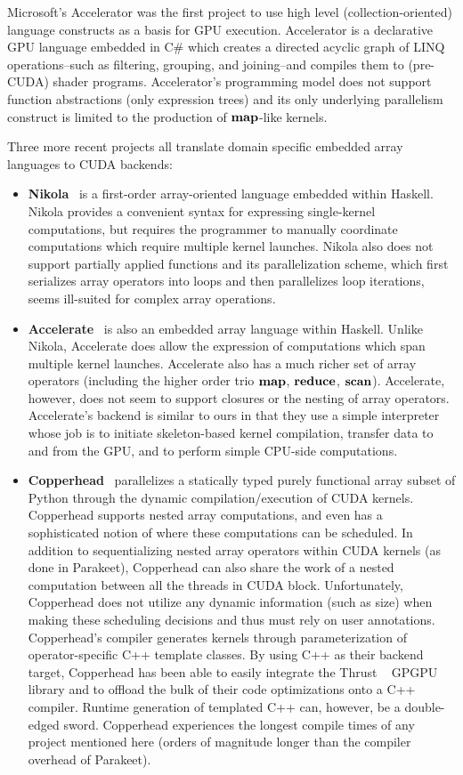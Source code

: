 \documentclass[preprint]{sigplanconf}
\begin{document}
Microsoft's Accelerator\cite{Tard06} was the first project to use high level (collection-oriented) language constructs as a basis for GPU execution. 
Accelerator is a declarative GPU language embedded in C\# which creates a directed acyclic graph of LINQ operations--such as filtering, grouping, and joining--and compiles them to
(pre-CUDA) shader programs. Accelerator's programming model does not support function abstractions (only expression trees) and its only underlying parallelism construct is limited to the production of $\mbox{\textbf{map}}$-like kernels. 

Three more recent projects all translate domain specific embedded array languages to CUDA backends: 
\begin{itemize}
\item \textbf{Nikola}~\cite{Main10} is a first-order array-oriented language embedded within Haskell. Nikola provides a convenient syntax for expressing single-kernel computations, but requires the programmer to manually coordinate computations which require multiple kernel launches. Nikola also does not support partially applied functions and its parallelization scheme, which first serializes array operators into loops and then parallelizes loop iterations, seems ill-suited for complex array operations. 

\item \textbf{Accelerate}~\cite{ChakAcc} is also an embedded array language within Haskell. Unlike Nikola, Accelerate does allow the expression of computations which span multiple kernel launches. Accelerate also has a much richer set of array operators (including the higher order trio $\mbox{\textbf{map}}$, $\mbox{\textbf{reduce}}$, $\mbox{\textbf{scan}}$). Accelerate, however, does not seem to support closures or the nesting of array operators. Accelerate's backend is similar to ours in that they use a simple interpreter whose job is to initiate skeleton-based kernel compilation, transfer data to and from the GPU, and to perform simple CPU-side computations. 

\item \textbf{Copperhead}~\cite{Cata10} parallelizes a statically typed purely functional array subset of Python through the dynamic compilation/execution of CUDA kernels. Copperhead supports nested array computations, and even has a sophisticated notion of where these computations can be scheduled. In addition to sequentializing nested array operators within CUDA kernels (as done in Parakeet), Copperhead can also share the work of a nested computation between all the threads in CUDA block. Unfortunately, Copperhead does not utilize any dynamic information (such as size) when making these scheduling decisions and thus must rely on user annotations. Copperhead's compiler generates kernels through parameterization of operator-specific C++ template classes. By using C++ as their backend target, Copperhead has been able to easily integrate the Thrust ~\cite{Hobe10} GPGPU library and to offload the bulk of their 
code optimizations onto a C++ compiler. Runtime generation of templated C++ can, however, be a double-edged sword. Copperhead experiences the longest compile times of any project mentioned here (orders of magnitude longer than the compiler overhead of Parakeet). 
\end{itemize} 
\end{document}
